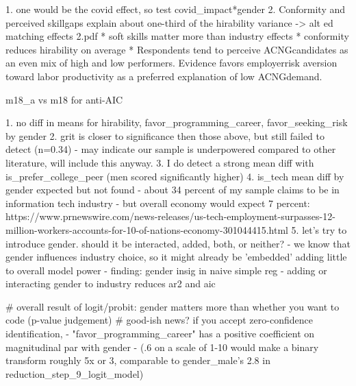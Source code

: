 \documentclass[review]{elsarticle}
\begin{document}
1. one would be the covid effect, so test covid_impact*gender
2.  Conformity  and  perceived  skillgaps  explain  about  one-third  of  the  hirability  variance -> alt ed matching effects 2.pdf
    * soft skills matter more than industry effects
    * conformity reduces hirability on average
    * Respondents tend to perceive ACNGcandidates as an even mix of high and low performers.  Evidence favors employerrisk aversion toward labor productivity as a preferred explanation of low ACNGdemand.

m18_a vs m18 for anti-AIC


1. no diff in means for hirability, favor_programming_career, favor_seeking_risk by gender
2. grit is closer to significance then those above, but still failed to detect (n=0.34)
    - may indicate our sample is underpowered compared to other literature, will include this anyway.
3. I do detect a strong mean diff with is_prefer_college_peer (men scored significantly higher)
4. is_tech mean diff by gender expected but not found
    - about 34 percent of my sample claims to be in information tech industry
    - but overall economy would expect 7 percent: https://www.prnewswire.com/news-releases/us-tech-employment-surpasses-12-million-workers-accounts-for-10-of-nations-economy-301044415.html
5. let's try to introduce gender. should it be interacted, added, both, or neither?
    - we know that gender influences industry choice, so it might already be 'embedded' adding little to overall model power
    - finding: gender insig in naive simple reg
    - adding or interacting gender to industry reduces ar2 and aic

    # overall result of logit/probit: gender matters more than whether you want to code (p-value judgement)
    # good-ish news? if you accept zero-confidence identification,
        - "favor_programming_career" has a positive coefficient on magnitudinal par with gender
        - (.6 on a scale of 1-10 would make a binary transform roughly 5x or 3, comparable to gender_male's 2.8 in reduction_step_9_logit_model)



\end{document}
